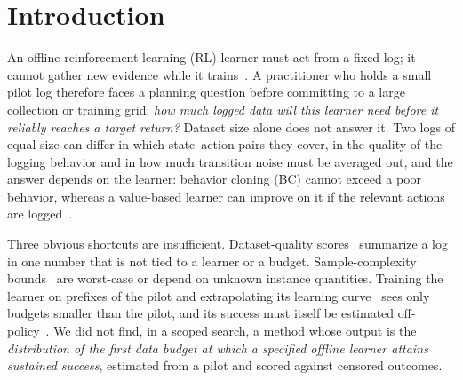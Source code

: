 \section{Introduction}
\label{sec:intro}

An offline reinforcement-learning (RL) learner must act from a fixed log; it cannot gather new evidence while it trains~\cite{levine2020offline}. A practitioner who holds a small pilot log therefore faces a planning question before committing to a large collection or training grid: \emph{how much logged data will this learner need before it reliably reaches a target return?} Dataset size alone does not answer it. Two logs of equal size can differ in which state--action pairs they cover, in the quality of the logging behavior and in how much transition noise must be averaged out, and the answer depends on the learner: behavior cloning (BC) cannot exceed a poor behavior, whereas a value-based learner can improve on it if the relevant actions are logged~\cite{kumar2022prefer}.

Three obvious shortcuts are insufficient. Dataset-quality scores~\cite{schweighofer2022dataset,swazinna2021quality,asadulaev2026bwd} summarize a log in one number that is not tied to a learner or a budget. Sample-complexity bounds~\cite{li2024sample,wang2022gapoffline} are worst-case or depend on unknown instance quantities. Training the learner on prefixes of the pilot and extrapolating its learning curve~\cite{domhan2015speeding,adriaensen2023efficient} sees only budgets smaller than the pilot, and its success must itself be estimated off-policy~\cite{le2019batch,voloshin2021empirical}. We did not find, in a scoped search, a method whose output is the \emph{distribution of the first data budget at which a specified offline learner attains sustained success}, estimated from a pilot and scored against censored outcomes.

